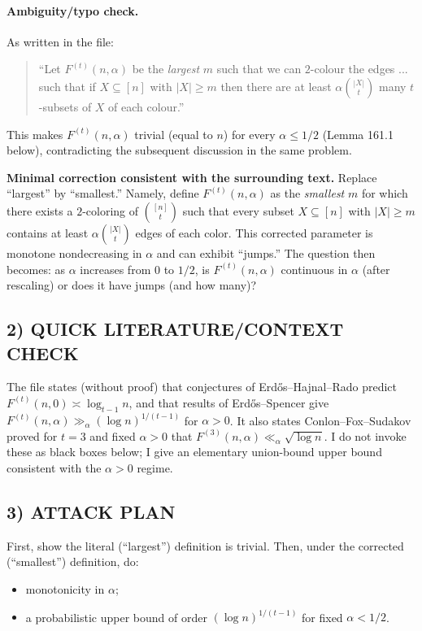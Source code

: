 \paragraph{Ambiguity/typo check.}
As written in the file:
\begin{quote}
``Let $F^{(t)}(n,\alpha)$ be the \emph{largest} $m$ such that we can $2$-colour the edges ... such that if $X\subseteq[n]$ with $|X|\ge m$ then there are at least $\alpha\binom{|X|}{t}$ many $t$-subsets of $X$ of each colour.''
\end{quote}
This makes $F^{(t)}(n,\alpha)$ trivial (equal to $n$) for every $\alpha\le 1/2$ (Lemma 161.1 below), contradicting the subsequent discussion in the same problem.

\medskip
\noindent\textbf{Minimal correction consistent with the surrounding text.}
Replace ``largest'' by ``smallest.'' Namely, define $F^{(t)}(n,\alpha)$ as the \emph{smallest} $m$ for which there exists a $2$-coloring of $\binom{[n]}{t}$ such that every subset $X\subseteq[n]$ with $|X|\ge m$ contains at least $\alpha\binom{|X|}{t}$ edges of each color.
This corrected parameter is monotone nondecreasing in $\alpha$ and can exhibit ``jumps.''
The question then becomes: as $\alpha$ increases from $0$ to $1/2$, is $F^{(t)}(n,\alpha)$ continuous in $\alpha$ (after rescaling) or does it have jumps (and how many)?

\subsection*{2) QUICK LITERATURE/CONTEXT CHECK}
The file states (without proof) that conjectures of Erd\H{o}s--Hajnal--Rado predict $F^{(t)}(n,0)\asymp \log_{t-1}n$, and that results of Erd\H{o}s--Spencer give $F^{(t)}(n,\alpha)\gg_{\alpha} (\log n)^{1/(t-1)}$ for $\alpha>0$. It also states Conlon--Fox--Sudakov proved for $t=3$ and fixed $\alpha>0$ that $F^{(3)}(n,\alpha)\ll_{\alpha}\sqrt{\log n}$.
I do not invoke these as black boxes below; I give an elementary union-bound upper bound consistent with the $\alpha>0$ regime.

\subsection*{3) ATTACK PLAN}
First, show the literal (``largest'') definition is trivial. Then, under the corrected (``smallest'') definition, do:
\begin{itemize}
\item monotonicity in $\alpha$;
\item a probabilistic upper bound of order $(\log n)^{1/(t-1)}$ for fixed $\alpha<1/2$.
\end{itemize}

